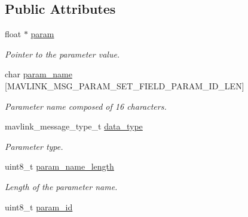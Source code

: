 \subsection*{Public Attributes}
\begin{DoxyCompactItemize}
\item 
\hypertarget{structonboard__parameters__entry__t_afda6a2f5b15c66b0e6b2147eb943d553}{float $\ast$ \hyperlink{structonboard__parameters__entry__t_afda6a2f5b15c66b0e6b2147eb943d553}{param}}\label{structonboard__parameters__entry__t_afda6a2f5b15c66b0e6b2147eb943d553}

\begin{DoxyCompactList}\small\item\em Pointer to the parameter value. \end{DoxyCompactList}\item 
\hypertarget{structonboard__parameters__entry__t_a287957d06c167840493d88e3672392f0}{char \hyperlink{structonboard__parameters__entry__t_a287957d06c167840493d88e3672392f0}{param\+\_\+name} \mbox{[}M\+A\+V\+L\+I\+N\+K\+\_\+\+M\+S\+G\+\_\+\+P\+A\+R\+A\+M\+\_\+\+S\+E\+T\+\_\+\+F\+I\+E\+L\+D\+\_\+\+P\+A\+R\+A\+M\+\_\+\+I\+D\+\_\+\+L\+E\+N\mbox{]}}\label{structonboard__parameters__entry__t_a287957d06c167840493d88e3672392f0}

\begin{DoxyCompactList}\small\item\em Parameter name composed of 16 characters. \end{DoxyCompactList}\item 
\hypertarget{structonboard__parameters__entry__t_a9830c64e88676d171a35f73bb36fe493}{mavlink\+\_\+message\+\_\+type\+\_\+t \hyperlink{structonboard__parameters__entry__t_a9830c64e88676d171a35f73bb36fe493}{data\+\_\+type}}\label{structonboard__parameters__entry__t_a9830c64e88676d171a35f73bb36fe493}

\begin{DoxyCompactList}\small\item\em Parameter type. \end{DoxyCompactList}\item 
\hypertarget{structonboard__parameters__entry__t_ae73fcb42354e05ad75758f9dfc84e700}{uint8\+\_\+t \hyperlink{structonboard__parameters__entry__t_ae73fcb42354e05ad75758f9dfc84e700}{param\+\_\+name\+\_\+length}}\label{structonboard__parameters__entry__t_ae73fcb42354e05ad75758f9dfc84e700}

\begin{DoxyCompactList}\small\item\em Length of the parameter name. \end{DoxyCompactList}\item 
\hypertarget{structonboard__parameters__entry__t_ac7000c6bd6e32f2e7b3f5799d389d7f6}{uint8\+\_\+t \hyperlink{structonboard__parameters__entry__t_ac7000c6bd6e32f2e7b3f5799d389d7f6}{param\+\_\+id}}\label{structonboard__parameters__entry__t_ac7000c6bd6e32f2e7b3f5799d389d7f6}


\end{DoxyCompactItemize}
